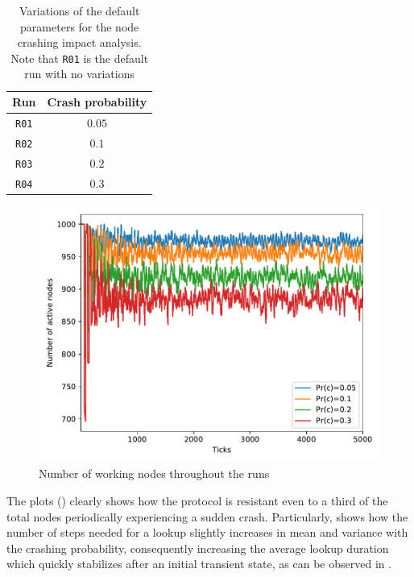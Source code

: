 \documentclass[11pt,twocolumn,letterpaper]{article}
\begin{document}
		\begin{table}[h!]
			\caption{Variations of the default parameters for the node crashing impact analysis. Note that \texttt{R01} is the default run with no variations}
			\label{tab:crash_runs}
			\centering
			\begin{tabular}{cc}
				\hline
				\textbf{Run} & \textbf{Crash probability}\\
				\hline
				\texttt{R01} & $0.05$\\
				\hline
				\texttt{R02} & $0.1$\\
				\hline
				\texttt{R03} & $0.2$\\
				\hline
				\texttt{R04} & $0.3$\\
				\hline
			\end{tabular}
		\end{table}
		\begin{figure}[h]
			\centering
			\includegraphics[width=\linewidth,clip,trim=0 0.5cm 0 0.35cm]{figures/analysis1/nodesup_time.pdf}
			\caption{Number of working nodes throughout the runs}
			\label{fig:crash0}
		\end{figure}

		The plots () clearly shows how the protocol is resistant even to a third of the total nodes periodically experiencing a sudden crash. Particularly,  shows how the number of steps needed for a lookup slightly increases in mean and variance with the crashing probability, consequently increasing the average lookup duration which quickly stabilizes after an initial transient state, as can be observed in . 
\end{document}

